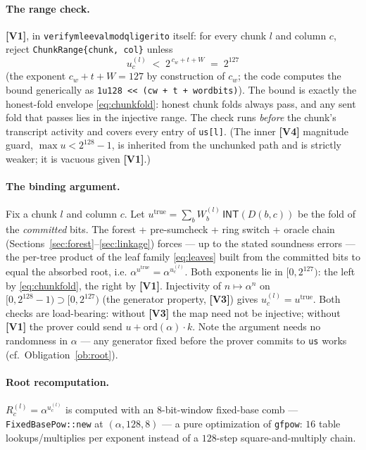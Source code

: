 \documentclass[11pt]{article}
\newcommand{\INT}{\mathsf{INT}}
\newcommand{\cw}{c_w}
\newcommand{\code}[1]{{\def\_{\textunderscore\allowbreak}\texttt{#1}}}
\newcommand{\Vc}[1]{\textbf{[V#1]}}    %
\begin{document}
\paragraph{The range check.}  \Vc{1}, in
\code{verify\_mle\_eval\_mod\_q\_ligerito} itself: for every chunk $l$ and
column $c$, reject \code{ChunkRange\{chunk, col\}} unless
\[
  u^{(l)}_c \;<\; 2^{\,\cw + t + W} \;=\; 2^{127}
\]
(the exponent $\cw + t + W = 127$ by construction of $\cw$; the code
computes the bound generically as
\code{1u128 << (c\_w + t + word\_bits)}).  The bound is exactly the
honest-fold envelope \eqref{eq:chunkfold}: honest chunk folds always
pass, and any sent fold that passes lies in the injective range.  The
check runs \emph{before} the chunk's transcript activity and covers every
entry of \code{us[l]}.  (The inner \Vc{4} magnitude guard,
$\max u < 2^{128}-1$, is inherited from the unchunked path and is
strictly weaker; it is vacuous given \Vc{1}.)

\paragraph{The binding argument.}  Fix a chunk $l$ and column $c$.  Let
$u^{\mathrm{true}} = \sum_b W^{(l)}_b\,\INT(D(b,c))$ be the fold of the
\emph{committed} bits.  The forest + pre-sumcheck + ring switch + oracle
chain (Sections~\ref{sec:forest}--\ref{sec:linkage}) forces — up to the
stated soundness errors — the per-tree product of the leaf family
\eqref{eq:leaves} built from the committed bits to equal the absorbed
root, i.e.
$\alpha^{u^{\mathrm{true}}} = \alpha^{u^{(l)}_c}$.
Both exponents lie in $[0, 2^{127})$: the left by
\eqref{eq:chunkfold}, the right by \Vc{1}.  Injectivity of
$n \mapsto \alpha^n$ on $[0, 2^{128}-1) \supset [0, 2^{127})$ (the
generator property, \Vc{3}) gives $u^{(l)}_c = u^{\mathrm{true}}$.  Both
checks are load-bearing: without \Vc{3} the map need not be injective;
without \Vc{1} the prover could send $u + \mathrm{ord}(\alpha) \cdot k$.
Note the argument needs no randomness in $\alpha$ — any generator fixed
before the prover commits to \code{us} works (cf.\
Obligation~\ref{ob:root}).

\paragraph{Root recomputation.}  $R^{(l)}_c = \alpha^{u^{(l)}_c}$ is
computed with an 8-bit-window fixed-base comb —
\code{FixedBasePow::new} at $(\alpha, 128, 8)$ — a pure optimization of
\code{gf\_pow}: $16$ table lookups/multiplies per exponent instead of a
$128$-step square-and-multiply chain.
\end{document}
